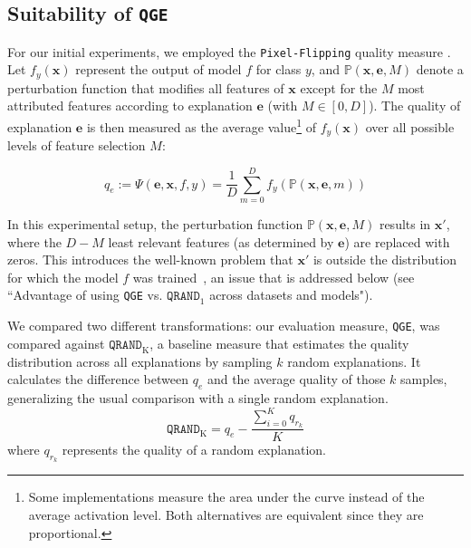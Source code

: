 \subsection{Suitability of \texttt{QGE}}\label{sec:suitability_qge}
For our initial experiments, we employed the \texttt{Pixel-Flipping} quality measure \cite{bach2015pixel}. Let $f_y(\mathbf{x})$ represent the output of model $f$ for class $y$, and $\mathbb{P}(\mathbf{x},\mathbf{e}, M)$ denote a perturbation function that modifies all features of $\mathbf{x}$ except for the $M$ most attributed features according to explanation $\mathbf{e}$ (with $M \in [0,D]$). The quality of explanation $\mathbf{e}$ is then measured as the average value\footnote{Some implementations measure the area under the curve instead of the average activation level. Both alternatives are equivalent since they are proportional.} of $f_y(\mathbf{x})$ over all possible levels of feature selection $M$:

\begin{equation}
\label{eq:q_value}
    q_e:=\Psi(\mathbf{e},\mathbf{x},f,y) = \frac{1}{D}\sum_{m=0}^{D}{f_y(\mathbb{P}(\mathbf{x},\mathbf{e},m))}
\end{equation}

In this experimental setup, the perturbation function $\mathbb{P}(\mathbf{x}, \mathbf{e}, M)$ results in $\mathbf{x'}$, where the $D-M$ least relevant features (as determined by $\mathbf{e}$) are replaced with zeros. This introduces the well-known problem that $\mathbf{x'}$ is outside the distribution for which the model $f$ was trained~\cite{hase2021}, an issue that is addressed below (see ``Advantage of using \texttt{QGE} vs. $\texttt{QRAND}_1$ across datasets and models").

We compared two different transformations: our evaluation measure, \texttt{QGE}, was compared against $\texttt{QRAND}_{\text{K}}$, a baseline measure that estimates the quality distribution across all explanations by sampling $k$ random explanations. It calculates the difference between $q_e$ and the average quality of those $k$ samples, generalizing the usual comparison with a single random explanation.
\begin{equation}
    \label{eq:qrand}
    \texttt{QRAND}_{\text{K}}
    = q_{e} - \frac{\sum_{i=0}^{K}{q_{r_k}}}{K}
\end{equation} where ${q_{r_k}}$ represents the quality of a random explanation.


